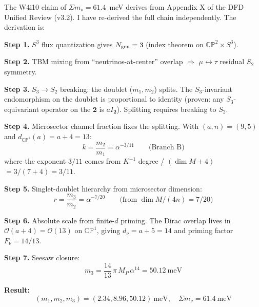 \documentclass[11pt,a4paper]{article}
\begin{document}
\begin{tcolorbox}[colback=blue!3!white, colframe=blue!60!black,
  title=\textbf{Finding \thesection: Neutrino mass prediction verified
  from Appendix X}\label{find:neutrino}]

The W4i10 claim of $\Sigma m_\nu = 61.4$~meV derives from Appendix X
of the DFD Unified Review (v3.2). I have re-derived the full chain
independently. The derivation is:

\textbf{Step 1.} $S^3$ flux quantization gives $N_{\rm gen} = 3$
(index theorem on $\mathbb{CP}^2 \times S^3$).

\textbf{Step 2.} TBM mixing from ``neutrinos-at-center'' overlap
$\Rightarrow$ $\mu \leftrightarrow \tau$ residual $S_2$ symmetry.

\textbf{Step 3.} $S_3 \to S_2$ breaking: the doublet ($m_1, m_2$)
splits. The $S_3$-invariant endomorphism on the doublet is proportional
to identity (proven: any $S_3$-equivariant operator on the
$\mathbf{2}$ is $a I_{\mathbf{2}}$). Splitting requires breaking to
$S_2$.

\textbf{Step 4.} Microsector channel fraction fixes the splitting.
With $(a, n) = (9, 5)$ and $d_{\mathbb{CP}^1}(a) = a + 4 = 13$:
\begin{equation}
k = \frac{m_2}{m_1} = \alpha^{-3/11} \qquad \text{(Branch B)}
\end{equation}
where the exponent $3/11$ comes from $K^{-1}$ degree / $(\dim M + 4)$
$= 3/(7+4) = 3/11$.

\textbf{Step 5.} Singlet-doublet hierarchy from microsector dimension:
\begin{equation}
r = \frac{m_3}{m_2} = \alpha^{-7/20} \qquad \text{(from $\dim M/(4n)
= 7/20$)}
\end{equation}

\textbf{Step 6.} Absolute scale from finite-$d$ priming. The Dirac
overlap lives in $\mathcal{O}(a+4) = \mathcal{O}(13)$ on
$\mathbb{CP}^1$, giving $d_\nu = a + 5 = 14$ and priming factor
$F_\nu = 14/13$.

\textbf{Step 7.} Seesaw closure:
\begin{equation}
m_3 = \frac{14}{13}\,\pi\,M_P\,\alpha^{14} = 50.12~\text{meV}
\end{equation}

\textbf{Result:}
\begin{equation}
\boxed{(m_1, m_2, m_3) = (2.34, 8.96, 50.12)~\text{meV}, \quad
\Sigma m_\nu = 61.4~\text{meV}}
\end{equation}


\end{tcolorbox}
\end{document}

